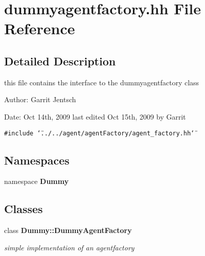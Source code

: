 \section{dummyagentfactory.hh File Reference}
\label{dummyagentfactory_8hh}


\subsection{Detailed Description}
this file contains the interface to the dummyagentfactory class

\begin{Desc}
\item[Author:]Garrit Jentsch\end{Desc}
\begin{Desc}
\item[Date:]Oct 14th, 2009 last edited Oct 15th, 2009 by Garrit \end{Desc}


{\tt \#include \char`\"{}../../agent/agentFactory/agent\_\-factory.hh\char`\"{}}\par
\subsection*{Namespaces}
\begin{CompactItemize}
\item 
namespace {\bf Dummy}
\end{CompactItemize}
\subsection*{Classes}
\begin{CompactItemize}
\item 
class {\bf Dummy::DummyAgentFactory}
\begin{CompactList}\small\item\em simple implementation of an agentfactory \item\end{CompactList}\end{CompactItemize}
